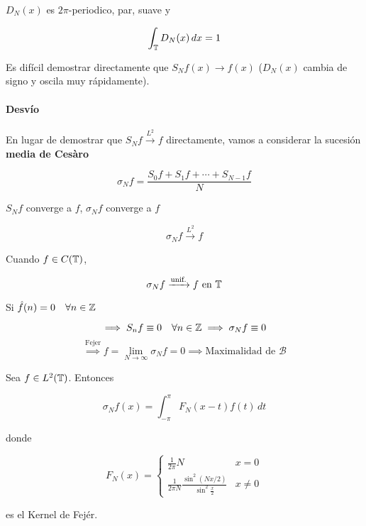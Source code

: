 \begin{fnote}
    $D_N(x)$ es $2\pi$-periodico, par, suave y 

    \[\int_{\mathbb{T}} D_N(x)\,dx=1\]


    Es difícil demostrar directamente que $S_N f(x)\to f(x)$ ($D_N(x)$ cambia de signo y oscila muy rápidamente). 
\end{fnote}

\paragraph{Desvío} En lugar de demostrar que $S_N f\xrightarrow{L^2}f$ directamente, vamos a considerar la sucesión \textbf{media de Cesàro}

\[\sigma_N f=\frac{S_0 f+S_1 f+\cdots + S_{N-1}f}{N}\]

\begin{fnote}
    $S_N f$ converge a $f$, $\sigma_N f$ converge a $f$
\end{fnote}

\begin{ftheorem}[Fejér]
    \[\sigma_N f\xrightarrow{L^2} f\]

    Cuando $f\in C(\mathbb{T})$, 

    \[\sigma_N f\xrightarrow{\text{unif.}} f\text{ en }\mathbb{T}\]
\end{ftheorem}

Si $\hat f(n)=0\quad\forall n\in\mathbb{Z}$

\[\implies S_n f \equiv 0\quad \forall n\in\mathbb{Z}\implies \sigma_N f\equiv 0\]
\[\overset{\text{Fejer}}{\implies} f=\lim_{N\to\infty}\sigma_N f=0\implies \text{Maximalidad de }\mathcal{B}\]

\begin{fproposition}
    Sea $f\in L^2(\mathbb{T})$. Entonces 

    \[\sigma_N f(x)=\int_{-\pi}^\pi F_N(x-t)f(t)\,dt\]

    donde 

    \[F_N(x)=\begin{cases}
        \frac{1}{2\pi}N & x=0\\
        \frac{1}{2\pi N} \frac{\sin^2(Nx/2)}{\sin^2 \frac{x}{2}}& x\neq 0
    \end{cases}\]

    es el Kernel de Fejér.
\end{fproposition}

